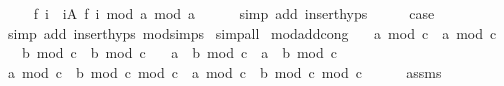 \begin{isabellebody}
\ \isamarkupfalse%
\ {\isachardoublequoteopen}{\isasymdots}\ {\isacharequal}{\kern0pt}\ {\isacharparenleft}{\kern0pt}f\ i\ {\isacharplus}{\kern0pt}\ {\isacharparenleft}{\kern0pt}{\isasymSum}i{\isasymin}A{\isachardot}{\kern0pt}\ f\ i{\isacharparenright}{\kern0pt}\ mod\ a{\isacharparenright}{\kern0pt}\ mod\ a{\isachardoublequoteclose}\isanewline
\ \ \ \ \isamarkupfalse%
\ {\isacharparenleft}{\kern0pt}simp\ add{\isacharcolon}{\kern0pt}\ insert{\isachardot}{\kern0pt}hyps{\isacharparenright}{\kern0pt}\isanewline
\ \ \isamarkupfalse%
\ \isamarkupfalse%
\ {\isacharquery}{\kern0pt}case\isanewline
\ \ \ \ \isamarkupfalse%
\ {\isacharparenleft}{\kern0pt}simp\ add{\isacharcolon}{\kern0pt}\ insert{\isachardot}{\kern0pt}hyps\ mod{\isacharunderscore}{\kern0pt}simps{\isacharparenright}{\kern0pt}\isanewline
{}\isamarkupfalse%
\ simp{\isacharunderscore}{\kern0pt}all%
\endisatagproof
{\isafoldproof}%
%
\isadelimproof
\isanewline
%
\endisadelimproof
\isanewline
{}\isamarkupfalse%
\ mod{\isacharunderscore}{\kern0pt}add{\isacharunderscore}{\kern0pt}cong{\isacharcolon}{\kern0pt}\isanewline
\ \ \ {\isachardoublequoteopen}a\ mod\ c\ {\isacharequal}{\kern0pt}\ a{\isacharprime}{\kern0pt}\ mod\ c{\isachardoublequoteclose}\isanewline
\ \ \ {\isachardoublequoteopen}b\ mod\ c\ {\isacharequal}{\kern0pt}\ b{\isacharprime}{\kern0pt}\ mod\ c{\isachardoublequoteclose}\isanewline
\ \ \ {\isachardoublequoteopen}{\isacharparenleft}{\kern0pt}a\ {\isacharplus}{\kern0pt}\ b{\isacharparenright}{\kern0pt}\ mod\ c\ {\isacharequal}{\kern0pt}\ {\isacharparenleft}{\kern0pt}a{\isacharprime}{\kern0pt}\ {\isacharplus}{\kern0pt}\ b{\isacharprime}{\kern0pt}{\isacharparenright}{\kern0pt}\ mod\ c{\isachardoublequoteclose}\isanewline
%
\isadelimproof
%
\endisadelimproof
%
\isatagproof
{}\isamarkupfalse%
\ {\isacharminus}{\kern0pt}\isanewline
\ \ \isamarkupfalse%
\ {\isachardoublequoteopen}{\isacharparenleft}{\kern0pt}a\ mod\ c\ {\isacharplus}{\kern0pt}\ b\ mod\ c{\isacharparenright}{\kern0pt}\ mod\ c\ {\isacharequal}{\kern0pt}\ {\isacharparenleft}{\kern0pt}a{\isacharprime}{\kern0pt}\ mod\ c\ {\isacharplus}{\kern0pt}\ b{\isacharprime}{\kern0pt}\ mod\ c{\isacharparenright}{\kern0pt}\ mod\ c{\isachardoublequoteclose}\isanewline
\ \ \ \ \isamarkupfalse%
\ assms\ \isacommand{{\isachardot}{\kern0pt}{\isachardot}{\kern0pt}}\isamarkupfalse%
\isanewline
\ \ \isamarkupfalse%
\ \isamarkupfalse%

\end{isabellebody}

